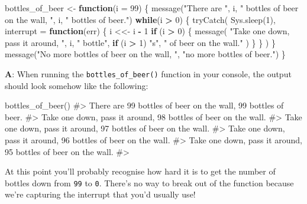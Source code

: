 \documentclass[
]{krantz}
\makeatletter
\newenvironment{Shaded}{\begin{snugshade}}{\end{snugshade}}
\newcommand{\CommentTok}[1]{\textcolor[rgb]{0.56,0.35,0.01}{\textit{#1}}}
\newcommand{\ControlFlowTok}[1]{\textcolor[rgb]{0.13,0.29,0.53}{\textbf{#1}}}
\newcommand{\DataTypeTok}[1]{\textcolor[rgb]{0.13,0.29,0.53}{#1}}
\newcommand{\DecValTok}[1]{\textcolor[rgb]{0.00,0.00,0.81}{#1}}
\newcommand{\KeywordTok}[1]{\textcolor[rgb]{0.13,0.29,0.53}{\textbf{#1}}}
\newcommand{\NormalTok}[1]{#1}
\newcommand{\OperatorTok}[1]{\textcolor[rgb]{0.81,0.36,0.00}{\textbf{#1}}}
\newcommand{\StringTok}[1]{\textcolor[rgb]{0.31,0.60,0.02}{#1}}
\newenvironment{kframe}{%
\medskip{}
\setlength{\fboxsep}{.8em}
 \def\at@end@of@kframe{}%
 \ifinner\ifhmode%
  \def\at@end@of@kframe{\end{minipage}}%
  \begin{minipage}{\columnwidth}%
 \fi\fi%
 \def\FrameCommand##1{\hskip\@totalleftmargin \hskip-\fboxsep
 \colorbox{shadecolor}{##1}\hskip-\fboxsep
     \hskip-\linewidth \hskip-\@totalleftmargin \hskip\columnwidth}%
 \MakeFramed {\advance\hsize-\width
   \@totalleftmargin\z@ \linewidth\hsize
   \@setminipage}}%
 {\par\unskip\endMakeFramed%
 \at@end@of@kframe}
\renewenvironment{Shaded}{\begin{kframe}}{\end{kframe}}
\renewcommand{\KeywordTok} [1]{\textcolor[rgb]{0.00,0.44,0.13}{{#1}}}
\renewcommand{\DataTypeTok}[1]{\textcolor[rgb]{0.56,0.13,0.00}{{#1}}}
\renewcommand{\DecValTok}  [1]{\textcolor[rgb]{0.25,0.63,0.44}{{#1}}}
\renewcommand{\StringTok}  [1]{\textcolor[rgb]{0.25,0.44,0.63}{{#1}}}
\renewcommand{\CommentTok} [1]{\textcolor[rgb]{0.38,0.63,0.69}{{#1}}}
\renewcommand{\NormalTok}  [1]{{#1}}
\makeatother
\begin{document}
\begin{Shaded}
\begin{Highlighting}[]
\NormalTok{bottles_of_beer <-}\StringTok{ }\ControlFlowTok{function}\NormalTok{(}\DataTypeTok{i =} \DecValTok{99}\NormalTok{) \{}
  \KeywordTok{message}\NormalTok{(}\StringTok{"There are "}\NormalTok{, i,}
          \StringTok{" bottles of beer on the wall, "}\NormalTok{, i,}
          \StringTok{" bottles of beer."}\NormalTok{)}
  \ControlFlowTok{while}\NormalTok{(i }\OperatorTok{>}\StringTok{ }\DecValTok{0}\NormalTok{) \{}
    \KeywordTok{tryCatch}\NormalTok{(}
      \KeywordTok{Sys.sleep}\NormalTok{(}\DecValTok{1}\NormalTok{),}
      \DataTypeTok{interrupt =} \ControlFlowTok{function}\NormalTok{(err) \{}
\NormalTok{        i <<-}\StringTok{ }\NormalTok{i }\OperatorTok{-}\StringTok{ }\DecValTok{1}
        \ControlFlowTok{if}\NormalTok{ (i }\OperatorTok{>}\StringTok{ }\DecValTok{0}\NormalTok{) \{}
          \KeywordTok{message}\NormalTok{(}
            \StringTok{"Take one down, pass it around, "}\NormalTok{, i, }
            \StringTok{" bottle"}\NormalTok{, }\ControlFlowTok{if}\NormalTok{ (i }\OperatorTok{>}\StringTok{ }\DecValTok{1}\NormalTok{) }\StringTok{"s"}\NormalTok{, }\StringTok{" of beer on the wall."}
\NormalTok{          )}
\NormalTok{        \}}
\NormalTok{      \}}
\NormalTok{    )}
\NormalTok{  \}}
  \KeywordTok{message}\NormalTok{(}\StringTok{"No more bottles of beer on the wall, "}\NormalTok{,}
          \StringTok{"no more bottles of beer."}\NormalTok{)}
\NormalTok{\}}
\end{Highlighting}
\end{Shaded}

\textbf{{A}}: When running the \texttt{bottles\_of\_beer()} function in your console, the output should look somehow like the following:

\begin{Shaded}
\begin{Highlighting}[]
\KeywordTok{bottles_of_beer}\NormalTok{()}
\CommentTok{#> There are 99 bottles of beer on the wall, 99 bottles of beer.}
\CommentTok{#> Take one down, pass it around, 98 bottles of beer on the wall.}
\CommentTok{#> Take one down, pass it around, 97 bottles of beer on the wall.}
\CommentTok{#> Take one down, pass it around, 96 bottles of beer on the wall.}
\CommentTok{#> Take one down, pass it around, 95 bottles of beer on the wall.}
\CommentTok{#> }
\end{Highlighting}
\end{Shaded}

At this point you'll probably recognise how hard it is to get the number of bottles down from \texttt{99} to \texttt{0}. There's no way to break out of the function because we're capturing the interrupt that you'd usually use!
\end{document}
